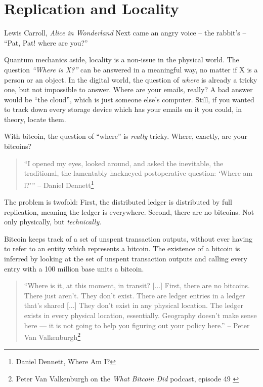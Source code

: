 \chapter{Replication and Locality}
\label{les:3}

\begin{chapquote}{Lewis Carroll, \textit{Alice in Wonderland}}
Next came an angry voice -- the rabbit's -- ``Pat, Pat! where are you?''
\end{chapquote}

Quantum mechanics aside, locality is a non-issue in the physical world.
The question \textit{``Where is X?''} can be answered in a meaningful way, no
matter if X is a person or an object. In the digital world, the question
of \textit{where} is already a tricky one, but not impossible to answer. Where
are your emails, really? A bad answer would be ``the cloud'', which is
just someone else's computer. Still, if you wanted to track down every
storage device which has your emails on it you could, in theory, locate
them.

With bitcoin, the question of ``where'' is \textit{really} tricky. Where,
exactly, are your bitcoins?

\begin{quotation}
``I opened my eyes, looked around, and asked the inevitable, the
traditional, the lamentably hackneyed postoperative question: `Where
am l?'''
\flushright -- Daniel Dennett\footnote{Daniel Dennett, Where Am I?\cite{where-am-i}} %
\end{quotation}

The problem is twofold: First, the distributed ledger is distributed by
full replication, meaning the ledger is everywhere. Second, there are no
bitcoins. Not only physically, but \textit{technically}.

Bitcoin keeps track of a set of unspent transaction outputs, without
ever having to refer to an entity which represents a bitcoin. The
existence of a bitcoin is inferred by looking at the set of unspent
transaction outputs and calling every entry with a 100 million base
units a bitcoin.

\begin{quotation}
``Where is it, at this moment, in transit? [...] First, there are no
bitcoins. There just aren't. They don't exist. There are ledger
entries in a ledger that's shared [...] They don't exist in any
physical location. The ledger exists in every physical location,
essentially. Geography doesn't make sense here --- it is not going to
help you figuring out your policy here.''
\flushright -- Peter Van Valkenburgh\footnote{Peter Van Valkenburgh on the \textit{What Bitcoin Did} podcast, episode 49 \cite{wbd049}}
\end{quotation}

